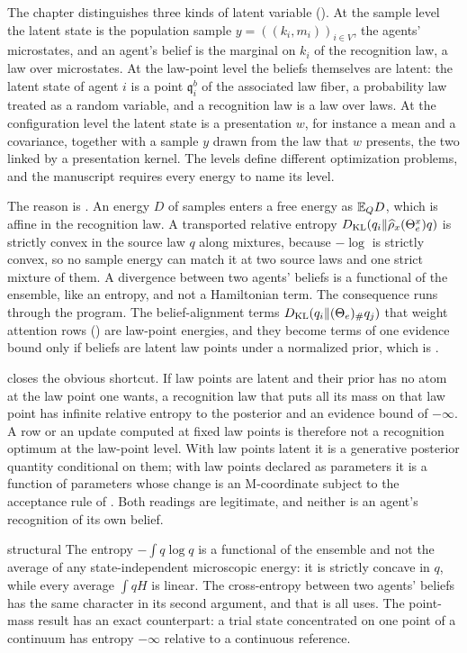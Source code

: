 The chapter distinguishes three kinds of latent variable (). At the sample
level the latent state is the population sample $y=((k_i,m_i))_{i\in V}$, the agents' microstates, and an
agent's belief is the marginal on $k_i$ of the recognition law, a law over microstates. At the law-point level
the beliefs themselves are latent: the latent state of agent $i$ is a point $\mathfrak q_i^b$ of the
associated law fiber, a probability law treated as a random variable, and a recognition law is a law over laws.
At the configuration level the latent state is a presentation $w$, for instance a mean and a covariance,
together with a sample $y$ drawn from the law that $w$ presents, the two linked by a presentation kernel. The
levels define different optimization problems, and the manuscript requires every energy to name its level.

The reason is . An energy $D$ of samples enters a free energy as $\mathbb E_QD$, which
is affine in the recognition law. A transported relative entropy $D_{\mathrm{KL}}(q_i\Vert\widehat\rho_x(\Theta_e^x)q)$ is
strictly convex in the source law $q$ along mixtures, because $-\log$ is strictly convex, so no sample energy
can match it at two source laws and one strict mixture of them. A divergence between two agents' beliefs is a
functional of the ensemble, like an entropy, and not a Hamiltonian term. The consequence runs through the
program. The belief-alignment terms $D_{\mathrm{KL}}(q_i\Vert(\Theta_e)_\#q_j)$ that weight attention rows
() are law-point energies, and they become terms of one evidence
bound only if beliefs are latent law points under a normalized prior, which is .

 closes the obvious shortcut. If law points are latent and their prior has
no atom at the law point one wants, a recognition law that puts all its mass on that law point has infinite
relative entropy to the posterior and an evidence bound of $-\infty$. A row or an update computed at fixed law
points is therefore not a recognition optimum at the law-point level. With law points latent it is a
generative posterior quantity conditional on them; with law points declared as parameters it is a function of
parameters whose change is an M-coordinate subject to the acceptance rule of
. Both readings are legitimate, and neither is an agent's recognition of
its own belief.

\begin{analogy}{structural}
The entropy $-\int q\log q$ is a functional of the ensemble and not the average of any state-independent
microscopic energy: it is strictly concave in $q$, while every average $\int qH$ is linear. The cross-entropy
between two agents' beliefs has the same character in its second argument, and that is all
 uses. The point-mass result has an exact counterpart: a trial state
concentrated on one point of a continuum has entropy $-\infty$ relative to a continuous reference.
\end{analogy}

